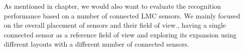 As mentioned in  chapter, we would also want to evaluate the recognition performance based on a number of connected LMC sensors. We mainly focused on the overall placement of sensors and their field of view., having a single connected sensor as a reference field of view and exploring its expansion using different layouts with a different number of connected sensors.